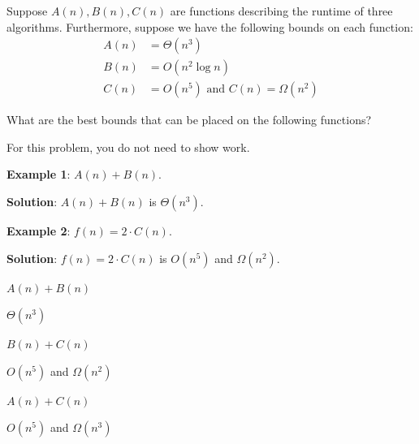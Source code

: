 \begin{prob}

    Suppose $A(n), B(n), C(n)$ are functions
    describing the runtime of three algorithms. Furthermore, suppose we
    have the following bounds on each function:
    \begin{align*}
        A(n) &= \Theta(n^{3})\\
        B(n) &= O(n^{2}\log n)\\
        C(n) &= O(n^{5}) \text{ and } C(n) = \Omega(n^{2})
    \end{align*}

    What are the best bounds that can be placed on the following functions?

    For this problem, you do not need to show work.

    \textbf{Example 1}: $A(n) + B(n)$.

    \textbf{Solution}: $A(n) + B(n)$ is $\Theta(n^{3})$.

    \textbf{Example 2}: $f(n) = 2 \cdot C(n)$.

    \textbf{Solution}: $f(n) = 2 \cdot C(n)$ is $O(n^5)$ and $\Omega(n^2)$.


    \begin{subprobset}

        \begin{subprob}
            $A(n) + B(n)$

            \begin{soln}
                $\Theta(n^{3})$
            \end{soln}
        \end{subprob}

        \begin{subprob}
            $B(n) + C(n)$

            \begin{soln}
                $O(n^{5})$ and $\Omega(n^{2})$
            \end{soln}
        \end{subprob}

        \begin{subprob}
            $A(n) + C(n)$

            \begin{soln}
                $O(n^{5})$ and $\Omega(n^{3})$
            \end{soln}
        \end{subprob}

    \end{subprobset}

\end{prob}
